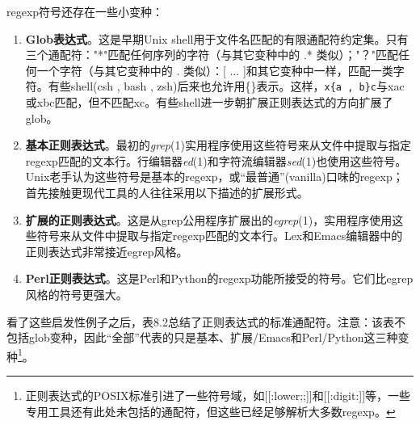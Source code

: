 \documentclass[12pt,oneside]{ctexbook}
\begin{document}
\begin{common-format}
regexp符号还存在一些小变种：
\begin{enumerate}
\item \textbf{Glob表达式}。这是早期Unix shell用于文件名匹配的有限通配符约定集。只有三个通配符："*"匹配任何序列的字符（与其它变种中的 .* 类似）；"？"匹配任何一个字符（与其它变种中的 . 类似）：[ ... ]和其它变种中一样，匹配一类字符。有些shell(csh , bash , zsh)后来也允许用\{\}表示。这样，\verb+x{a , b}c+与xac或xbc匹配，但不匹配xc。有些shell进一步朝扩展正则表达式的方向扩展了glob。
\item \textbf{基本正则表达式}。最初的\textit{grep}(1)实用程序使用这些符号来从文件中提取与指定regexp匹配的文本行。行编辑器\textit{ed}(1)和字符流编辑器\textit{sed}(1)也使用这些符号。Unix老手认为这些符号是基本的regexp，或“最普通”(vanilla)口味的regexp；首先接触更现代工具的人往往采用以下描述的扩展形式。
\item \textbf{扩展的正则表达式}。这是从grep公用程序扩展出的\textit{egrep}(1)，实用程序使用这些符号来从文件中提取与指定regexp匹配的文本行。Lex和Emacs编辑器中的正则表达式非常接近egrep风格。
\item \textbf{Perl正则表达式}。这是Perl和Python的regexp功能所接受的符号。它们比egrep风格的符号更强大。
\end{enumerate}

看了这些启发性例子之后，表8.2总结了正则表达式的标准通配符。注意：该表不包括glob变种，因此“全部”代表的只是基本、扩展/Emacs和Perl/Python这三种变种\footnote{正则表达式的POSIX标准引进了一些符号域，如[[:lower;;]]和[[:digit:]]等，一些专用工具还有此处未包括的通配符，但这些已经足够解析大多数regexp。}。



\end{common-format}
\end{document}
